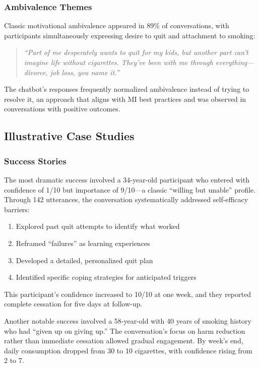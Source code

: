 \subsubsection*{Ambivalence Themes}

Classic motivational ambivalence appeared in 89\% of conversations, with participants simultaneously expressing desire to quit and attachment to smoking:

\begin{quote}
\textit{``Part of me desperately wants to quit for my kids, but another part can't imagine life without cigarettes. They've been with me through everything---divorce, job loss, you name it.''}
\end{quote}

The chatbot's responses frequently normalized ambivalence instead of trying to resolve it, an approach that aligns with MI best practices and was observed in conversations with positive outcomes.

\subsection*{Illustrative Case Studies}
\label{sec:case-studies}

\subsubsection*{Success Stories}

The most dramatic success involved a 34-year-old participant who entered with confidence of 1/10 but importance of 9/10---a classic ``willing but unable'' profile. Through 142 utterances, the conversation systematically addressed self-efficacy barriers:

\begin{enumerate}
\item Explored past quit attempts to identify what worked
\item Reframed ``failures'' as learning experiences
\item Developed a detailed, personalized quit plan
\item Identified specific coping strategies for anticipated triggers
\end{enumerate}

This participant's confidence increased to 10/10 at one week, and they reported complete cessation for five days at follow-up.

Another notable success involved a 58-year-old with 40 years of smoking history who had ``given up on giving up.'' The conversation's focus on harm reduction rather than immediate cessation allowed gradual engagement. By week's end, daily consumption dropped from 30 to 10 cigarettes, with confidence rising from 2 to 7.

